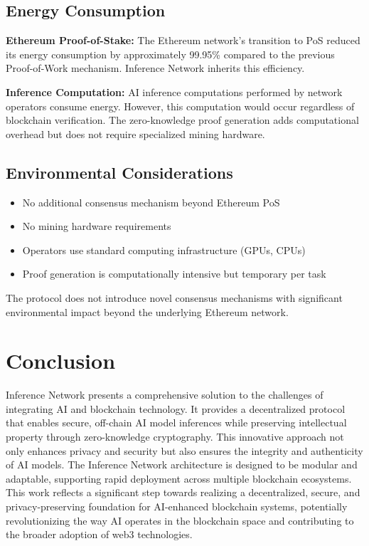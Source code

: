 \documentclass[conference]{IEEEtran}
\begin{document}
\subsection{Energy Consumption}
\textbf{Ethereum Proof-of-Stake:} The Ethereum network's transition to PoS reduced its energy consumption by approximately 99.95\% compared to the previous Proof-of-Work mechanism. Inference Network inherits this efficiency.

\textbf{Inference Computation:} AI inference computations performed by network operators consume energy. However, this computation would occur regardless of blockchain verification. The zero-knowledge proof generation adds computational overhead but does not require specialized mining hardware.

\subsection{Environmental Considerations}
\begin{itemize}
\item No additional consensus mechanism beyond Ethereum PoS
\item No mining hardware requirements
\item Operators use standard computing infrastructure (GPUs, CPUs)
\item Proof generation is computationally intensive but temporary per task
\end{itemize}

The protocol does not introduce novel consensus mechanisms with significant environmental impact beyond the underlying Ethereum network.

\section{Conclusion}
Inference Network presents a comprehensive solution to the challenges of integrating AI and blockchain technology. It provides a decentralized protocol that enables secure, off-chain AI model inferences while preserving intellectual property through zero-knowledge cryptography. This innovative approach not only enhances privacy and security but also ensures the integrity and authenticity of AI models. The Inference Network architecture is designed to be modular and adaptable, supporting rapid deployment across multiple blockchain ecosystems. This work reﬂects a signiﬁcant step towards realizing a decentralized, secure, and privacy-preserving foundation for AI-enhanced blockchain systems, potentially revolutionizing the way AI operates in the blockchain space and contributing to the broader adoption of web3 technologies.
\end{document}
